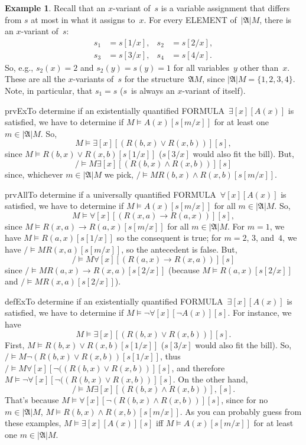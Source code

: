 \documentclass[10pt,a4paper]{article}
\newcommand*{\olup}[1]{\MakeUppercase{#1}}
\theoremstyle{plain}
\theoremstyle{definition}
\newtheorem{ex}[thm]{Example}
\theoremstyle{remark}
\providecommand{\lif}{\mathbin{\rightarrow}}
\providecommand{\lforall}{\mathord{\forall}}
\providecommand{\lexists}{\mathord{\exists}}
\providecommand{\Subst}[3]{#1[#2/#3]}
\providecommand{\Struct}{\ensuremath{\mathfrak{A}}}
\providecommand{\Domain}{\ensuremath{|\mathfrak{A}|}}
\providecommand{\Sat}[2]{\ensuremath{#1 \models #2}}
\providecommand{\iftag}[1]{#1}
\providecommand{\iftag}{}
\begin{document}
\begin{ex}
Recall that an $x$-variant of~$s$ is a variable assignment that
differs from $s$ at most in what it assigns to~$x$. For every
\olup{element} of~$\Domain{M}$, there is an $x$-variant of~$s$:
\begin{align*}
  s_1 & = \Subst{s}{1}{x}, &
  s_2 & = \Subst{s}{2}{x},\\
  s_3 & = \Subst{s}{3}{x}, &
  s_4 & = \Subst{s}{4}{x}.
\end{align*}
So, e.g., $s_2(x) = 2$ and $s_2(y) = s(y) = 1$ for all variables~$y$
other than~$x$. These are all the $x$-variants of~$s$ for the
structure~$\Struct{M}$, since $\Domain{M} = \{1, 2, 3, 4\}$. Note, in
particular, that $s_1 = s$ ($s$~is always an $x$-variant of itself).

\iftag{prvEx}{To determine if an existentially quantified
  \olup{formula}~$\lexists[x][A(x)]$ is satisfied, we have to determine
  if $\Sat{M}{A(x)}[\Subst{s}{m}{x}]$ for at least one $m \in \Domain
  M$. So,
  \[
  \Sat{M}{\lexists[x][(R(b,x) \lor R(x,b))]}[s],
  \]
  since $\Sat{M}{R(b,x) \lor R(x, b)}[\Subst{s}{1}{x}]$
  ($\Subst{s}{3}{x}$ would also fit the bill).  But,
  \[
  \Sat/{M}{\lexists[x][(R(b,x) \land R(x,b))]}[s]
  \]
  since, whichever $m \in \Domain{M}$ we pick, $\Sat/{M}{R(b,x) \land R(x,b)}[\Subst{s}{m}{x}]$.}{}

\iftag{prvAll}{To determine if a universally quantified
  \olup{formula}~$\lforall[x][A(x)]$ is satisfied, we have to determine
  if $\Sat{M}{A(x)}[\Subst{s}{m}{x}]$ for all $m \in \Domain M$. So,
  \[
  \Sat{M}{\lforall[x][(R(x,a) \lif R(a,x))]}[s],
  \]
  since $\Sat{M}{R(x,a) \lif R(a,x)}[\Subst{s}{m}{x}]$ for all $m \in
  \Domain M$. For $m = 1$, we have $\Sat{M}{R(a,x)}[\Subst{s}{1}{x}]$
  so the consequent is true; for $m = 2$, $3$, and~$4$, we have
  $\Sat/{M}{R(x,a)}[\Subst{s}{m}{x}]$, so the antecedent is false.
  But,
  \[
  \Sat/{M}{\lforall[x][(R(a,x) \lif R(x,a))]}[s]
  \]
  since $\Sat/{M}{R(a,x) \lif R(x,a)}[\Subst{s}{2}{x}]$ (because
  $\Sat{M}{R(a, x)}[\Subst{s}{2}{x}]$ and $\Sat/{M}{R(x,
  a)}[\Subst{s}{2}{x}]$).}{}

\iftag{defEx}{To determine if an existentially quantified
  \olup{formula}~$\lexists[x][A(x)]$ is satisfied, we have to determine
  if $\Sat{M}{\lnot \lforall[x][\lnot A(x)]}[s]$. For instance, we
  have
  \[
  \Sat{M}{\lexists[x][(R(b,x) \lor R(x,b))]}[s].
  \]
  First, $\Sat{M}{R(b,x) \lor R(x, b)}[\Subst{s}{1}{x}]$
  ($\Subst{s}{3}{x}$ would also fit the bill).  So,
  $\Sat/{M}{\lnot(R(b,x) \lor R(x,b))}[\Subst{s}{1}{x}]$, thus
  $\Sat/{M}{\lforall[x][\lnot((R(b,x) \lor R(x,b))]}[s]$, and
  therefore $\Sat{M}{\lnot\lforall[x][\lnot((R(b,x) \lor
  R(x,b))]}[s]$. On the other hand,
  \[
  \Sat/{M}{\lexists[x][(R(b,x) \land R(x,b))],}[s].
  \]
  That's because $\Sat{M}{\lforall[x][\lnot(R(b,x) \land
  R(x,b))]}[s]$, since for no $m \in \Domain M$, $\Sat{M}{R(b,x) \land
  R(x,b)}[\Subst{s}{m}{x}]$. As you can probably guess from these
  examples, $\Sat{M}{\lexists[x][A(x)]}[s]$ iff
  $\Sat{M}{A(x)}[\Subst{s}{m}{x}]$ for at least one $m \in \Domain
  M$.}{}


\end{ex}
\end{document}
